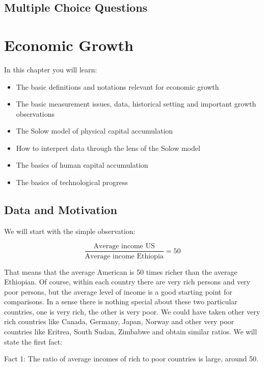 \documentclass[
]{book}
\providecommand{\tightlist}{%
  \setlength{\itemsep}{0pt}\setlength{\parskip}{0pt}}
\begin{document}
\hypertarget{multiple-choice-questions}{%
\section{Multiple Choice Questions}\label{multiple-choice-questions}}

\hypertarget{growth}{%
\chapter{Economic Growth}\label{growth}}

In this chapter you will learn:

\begin{itemize}
\tightlist
\item
  The basic definitions and notations relevant for economic growth
\item
  The basic measurement issues, data, historical setting and important growth observations
\item
  The Solow model of physical capital accumulation
\item
  How to interpret data through the lens of the Solow model
\item
  The basics of human capital accumulation
\item
  The basics of technological progress
\end{itemize}

\hypertarget{data-and-motivation}{%
\section{Data and Motivation}\label{data-and-motivation}}

We will start with the simple observation:

\[\frac{\text{Average income US}}{\text{Average income Ethiopia}} = 50\]

That means that the average American is 50 times richer than the average Ethiopian. Of course, within each country there are very rich persons and very poor persons, but the average level of income is a good starting point for comparisons. In a sense there is nothing special about these two particular countries, one is very rich, the other is very poor. We could have taken other very rich countries like Canada, Germany, Japan, Norway and other very poor countries like Eritrea, South Sudan, Zimbabwe and obtain similar ratios.
We will state the first fact:

Fact 1: The ratio of average incomes of rich to poor countries is large, around 50.
\end{document}
